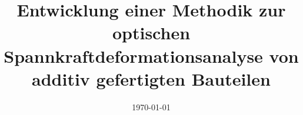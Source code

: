 \documentclass[t, aspectratio=169]{beamer}
\begin{document}
\title[]{Entwicklung einer Methodik zur optischen Spannkraftdeformationsanalyse von additiv gefertigten Bauteilen}
\date{\today}
\begin{frame}[plain]
  \maketitle
  \vspace{1.5cm}  
\end{frame}








\end{document}
